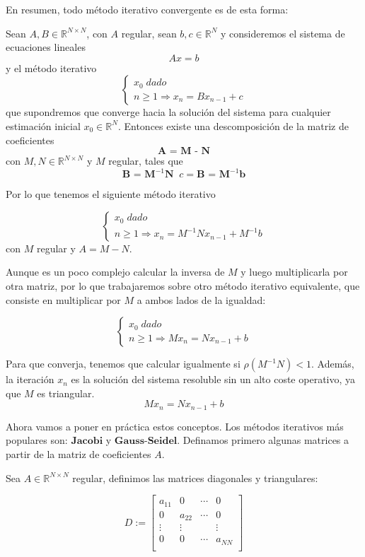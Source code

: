 En resumen, todo método iterativo convergente es de esta forma:

\begin{nprop}
Sean $A, B \in \mathbb{R}^{N \times N}$, con $A$ regular, sean $b, c \in \mathbb{R}^N$ y consideremos el sistema de ecuaciones lineales $$Ax = b$$ y el método iterativo
\[ \left\{ \begin{array}{c}
x_0 \; dado \\
n \geq 1 \Rightarrow x_n = Bx_{n-1} + c
\end{array}
\right. \]
que supondremos que converge hacia la solución del sistema para cualquier estimación inicial $x_0 \in \mathbb{R}^N$. Entonces existe una descomposición de la matriz de coeficientes
\[ \textbf{A = M - N} \]
con $M, N \in \mathbb{R}^{N \times N}$ y $M$ regular, tales que
\[ \textbf{B = M}^{-1} \textbf{N} \; \; c = \textbf{B = M}^{-1} \textbf{b} \]
\end{nprop}

Por lo que tenemos el siguiente método iterativo

\[ \left\{ \begin{array}{c}
x_0 \; dado \\
n \geq 1 \Rightarrow x_n = M^{-1}Nx_{n-1} + M^{-1}b
\end{array}
\right. \]
con $M$ regular y $A = M - N$.

Aunque es un poco complejo calcular la inversa de $M$ y luego multiplicarla por otra matriz, por lo que trabajaremos sobre otro método iterativo equivalente, que consiste en multiplicar por $M$ a ambos lados de la igualdad:

\[ \left\{ \begin{array}{c}
x_0 \; dado \\
n \geq 1 \Rightarrow Mx_n = Nx_{n-1} + b
\end{array}
\right. \]

Para que converja, tenemos que calcular igualmente si $\rho (M^{-1}N) < 1$. Además, la iteración $x_n$ es la solución del sistema resoluble sin un alto coste operativo, ya que $M$ es triangular.
\[ Mx_n = Nx_{n-1} + b \]

Ahora vamos a poner en práctica estos conceptos. Los métodos iterativos más populares son: $\textbf{Jacobi}$ y $\textbf{Gauss-Seidel}$. Definamos primero algunas matrices a partir de la matriz de coeficientes $A$.

Sea $A \in \mathbb{R}^{N \times N}$ regular, definimos las matrices diagonales y triangulares:

\[ D := \begin{bmatrix}
a_{11} & 0 & \cdots & 0 \\
0 & a_{22} & \cdots & 0 \\
\vdots & \vdots & & \vdots \\
0 & 0 & \cdots & a_{NN} \\
\end{bmatrix} \]

